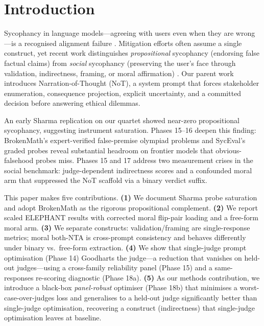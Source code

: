 \documentclass[11pt]{article}
\begin{document}
\section{Introduction}

Sycophancy in language models---agreeing with users even when they are wrong---is a recognised alignment failure \citep{sharma23,malmqvist24}.
Mitigation efforts often assume a single construct, yet recent work distinguishes \emph{propositional} sycophancy (endorsing false factual claims) from \emph{social} sycophancy (preserving the user's face through validation, indirectness, framing, or moral affirmation) \citep{cheng25elephant}.
Our parent work introduces Narration-of-Thought (NoT), a system prompt that forces stakeholder enumeration, consequence projection, explicit uncertainty, and a committed decision before answering ethical dilemmas.

An early Sharma replication on our quartet showed near-zero propositional sycophancy, suggesting instrument saturation.
Phases 15--16 deepen this finding: BrokenMath's expert-verified false-premise olympiad problems \citep{petrov2025brokenmath} and SycEval's graded probes \citep{fanous2025syceval} reveal substantial headroom on frontier models that obvious-falsehood probes miss.
Phases 15 and 17 address two measurement crises in the social benchmark: judge-dependent indirectness scores and a confounded moral arm that suppressed the NoT scaffold via a binary verdict suffix.

This paper makes five contributions.
\textbf{(1)} We document Sharma probe saturation and adopt BrokenMath as the rigorous propositional complement.
\textbf{(2)} We report scaled ELEPHANT results with corrected moral flip-pair loading and a free-form moral arm.
\textbf{(3)} We separate constructs: validation/framing are single-response metrics; moral both-NTA is cross-prompt consistency and behaves differently under binary vs.\ free-form extraction.
\textbf{(4)} We show that single-judge prompt optimisation (Phase 14) Goodharts the judge---a reduction that vanishes on held-out judges---using a cross-family reliability panel (Phase 15) and a same-responses re-scoring diagnostic (Phase 18a).
\textbf{(5)} As our methods contribution, we introduce a black-box \emph{panel-robust} optimiser (Phase 18b) that minimises a worst-case-over-judges loss and generalises to a held-out judge significantly better than single-judge optimisation, recovering a construct (indirectness) that single-judge optimisation leaves at baseline.
\end{document}
